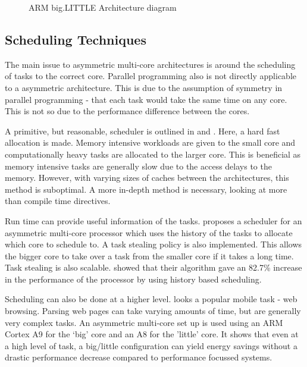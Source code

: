 \begin{figure}
\caption{ARM big.LITTLE Architecture diagram}
\label{fig:bigLITTLE:arch}
\end{figure}


\subsection{Scheduling Techniques}

The main issue to asymmetric multi-core architectures is around the scheduling of tasks to the correct core.
Parallel programming also is not directly applicable to a asymmetric architecture. 
This is due to the assumption of symmetry in parallel programming - that each task would take the same time on any core. 
This is not so due to the performance difference between the cores.

A primitive, but reasonable, scheduler is outlined in \cite{esmaeilzadeh2011dark} and \cite{jimenez2009predictive}.
Here, a hard fast allocation is made. 
Memory intensive workloads are given to the small core and computationally heavy tasks are allocated to the larger core. 
This is beneficial as memory intensive tasks are generally slow due to the access delays to the memory. 
However, with varying sizes of caches between the architectures, this method is suboptimal. 
A more in-depth method is necessary, looking at more than compile time directives.



Run time can provide useful information of the tasks. 
\cite{chen2012wats} proposes a scheduler for an asymmetric multi-core processor which uses the history of the tasks to allocate which core to schedule to. %
A task stealing policy is also implemented. 
This allows the bigger core to take over a task from the smaller core if it takes a long time.
Task stealing is also scalable. 
\cite{chen2012wats} showed that their algorithm gave an 82.7\% increase in the performance of the processor by using history based scheduling.

Scheduling can also be done at a higher level. 
\cite{zhu2013high} looks a popular mobile task - web browsing. 
Parsing web pages can take varying amounts of time, but are generally very complex tasks. 
An asymmetric multi-core set up is used using an ARM Cortex A9 for the `big' core and an A8 for the 'little' core. 
It shows that even at a high level of task, a big/little configuration can yield energy savings without a drastic performance decrease compared to performance focussed systems.

